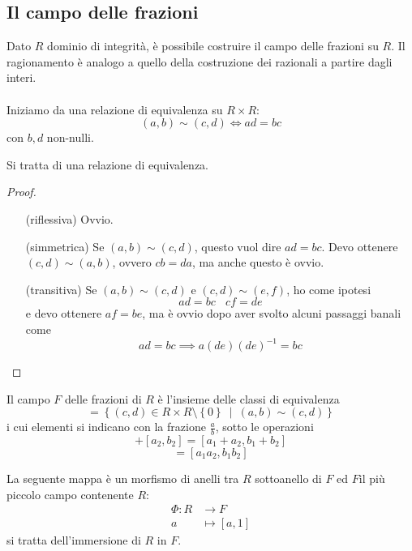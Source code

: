 \subsection{Il campo delle frazioni}
Dato $R$ dominio di integrità, è possibile costruire il campo delle frazioni su $R$. Il ragionamento è analogo a quello della costruzione dei razionali a partire dagli interi. \\ \\ Iniziamo da una relazione di equivalenza su $R\times R$:
\begin{equation*}
	(a,b)\sim(c,d) \iff ad=bc
\end{equation*}
con $b,d$ non-nulli. 
\begin{proposizione}
	Si tratta di una relazione di equivalenza.
\end{proposizione}
\begin{proof}\
	\begin{itemize}
		\item[(riflessiva)] Ovvio.
		\item[(simmetrica)] Se $(a,b)\sim(c,d)$, questo vuol dire $ad=bc$. Devo ottenere $(c,d)\sim(a,b)$, ovvero $cb=da$, ma anche questo è ovvio.
		\item[(transitiva)] Se $(a,b)\sim(c,d)$ e $(c,d)\sim(e,f)$, ho come ipotesi
		\begin{equation*}
			ad=bc \ \ \ \ cf=de
		\end{equation*}
		e devo ottenere $af=be$, ma è ovvio dopo aver svolto alcuni passaggi banali come
		\begin{equation*}
		ad=bc\implies a(de)(de)^{-1}=bc
		\end{equation*}
	\end{itemize}
\end{proof}
\begin{definizione}
	Il campo $F$ delle frazioni di $R$ è l'insieme delle classi di equivalenza 
	\begin{equation*}
	[a,b]=\left\{(c,d)\in R\times R\setminus\left\{0\right\} \ \mid \ (a,b)\sim(c,d)\right\}
	\end{equation*}
	i cui elementi si indicano con la frazione $\frac{a}{b}$, sotto le operazioni
	\begin{equation*}
	[a_1,b_1]+[a_2,b_2]=[a_1+a_2,b_1+b_2]
	\end{equation*}
	\begin{equation*}
	[a_1,b_1][a_2,b_2]=[a_1a_2,b_1b_2]
	\end{equation*}
\end{definizione}
\begin{osservazione}[Immersione di $R$ in $F$]
	La seguente mappa è un morfismo di anelli tra $R$ sottoanello di $F$ ed $F $il più piccolo campo contenente $R$:
	\begin{align*}
	\Phi:R&\longrightarrow F\\
	a&\longmapsto [a,1]
	\end{align*}
	si tratta dell'immersione di $R$ in $F$.
\end{osservazione}
